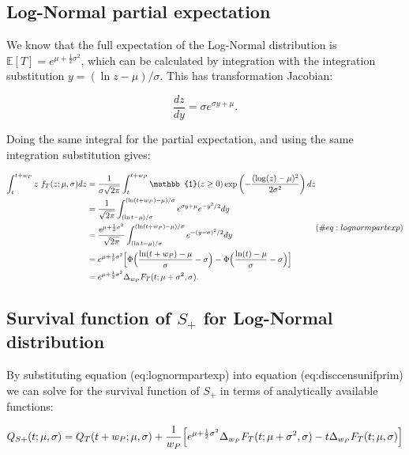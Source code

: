 \documentclass[10pt,letterpaper]{article}
\begin{document}
\subsection{Log-Normal partial expectation}

We know that the full expectation of the Log-Normal distribution is $\mathbb{E}[T] = e^{\mu + \frac{1}{2} \sigma^2}$, which can be calculated by integration with the integration substitution $y = (\ln z - \mu) / \sigma$. This has transformation Jacobian:

\begin{equation}
\frac{dz}{dy} = \sigma e^{\sigma y + \mu}.
\end{equation}

Doing the same integral for the partial expectation, and using the same integration substitution gives:

\begin{equation}
\begin{aligned}
\int_t^{t+w_P} z~ f_T(z; \mu, \sigma) dz &= {1 \over \sigma \sqrt{2\pi}} \int_t^{t+w_P}  \mathbb{1}(z \geq 0)  \exp\left( - {(\log(z) - \mu)^2 \over 2 \sigma^2} \right) dz \\
&= {1 \over \sqrt{2\pi}} \int_{(\ln t - \mu)/\sigma}^{(\ln(t+w_P) - \mu)/\sigma} e^{\sigma y + \mu} e^{-y^2/2} dy\\
&= {e^{\mu + \frac{1}{2} \sigma^2} \over \sqrt{2 \pi} } \int_{(\ln t - \mu)/\sigma}^{(\ln(t+w_P) - \mu)/\sigma} e^{-(y- \sigma)^2/2} dy \\
&= e^{\mu + \frac{1}{2} \sigma^2} \Big[\Phi\Big({\ln(t+w_P) - \mu \over \sigma} - \sigma\Big) - \Phi\Big({\ln(t) - \mu \over \sigma} - \sigma\Big) \Big]\\
&= e^{\mu + \frac{1}{2} \sigma^2} \Delta_{w_P}F_T(t; \mu + \sigma^2, \sigma).
\end{aligned} (\#eq:lognormpartexp)
\end{equation}

\subsection{Survival function of $S_{+}$ for Log-Normal distribution}

By substituting equation \@ref(eq:lognormpartexp) into equation \@ref(eq:disccensunifprim) we can solve for the survival function of $S_+$ in terms of analytically available functions:

\begin{equation}
Q_{S+}(t ;\mu, \sigma) = Q_T(t + w_P;\mu, \sigma) + { 1 \over w_P} \Big[ e^{\mu + \frac{1}{2} \sigma^2} \Delta_{w_P}F_T(t; \mu + \sigma^2, \sigma) - t\Delta_{w_P}F_T(t; \mu, \sigma) \Big]
\end{equation}
\end{document}
